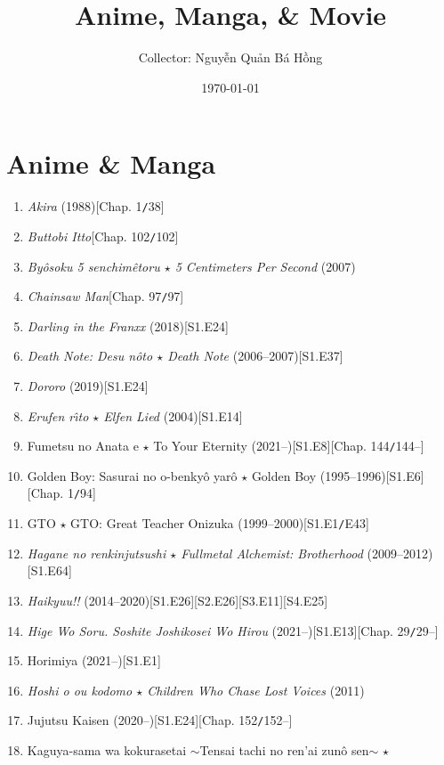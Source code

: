 \documentclass{article}
\title{Anime, Manga, {\large\&} Movie}
\author{Collector: Nguyễn Quản Bá Hồng}
\date{\today}
\begin{document}
\maketitle
\tableofcontents


\section{Anime \& Manga}
\begin{enumerate}
    \item \textit{Akira} (1988)\hfill[Chap. 1\texttt{/}38]
    \item \textit{Buttobi Itto}\hfill[Chap. 102\texttt{/}102]
    \item \textit{By\^osoku 5 senchimêtoru $\star$ 5 Centimeters Per Second} (2007)
    \item \textit{Chainsaw Man}\hfill[Chap. 97\texttt{/}97]
    \item \textit{Darling in the Franxx} (2018)\hfill[S1.E24]
    \item \textit{Death Note: Desu n\^oto $\star$ Death Note} (2006--2007)\hfill[S1.E37]
    \item \textit{Dororo} (2019)\hfill[S1.E24]
    \item \textit{Erufen r\^{\i}to $\star$ Elfen Lied} (2004)\hfill[S1.E14]
    \item Fumetsu no Anata e $\star$ To Your Eternity (2021--)\hfill[S1.E8][Chap. 144\texttt{/}144--]
    \item Golden Boy: Sasurai no o-benky\^o yar\^o $\star$ Golden Boy (1995--1996)\hfill[S1.E6][Chap. 1\texttt{/}94]
    \item GTO $\star$ GTO: Great Teacher Onizuka (1999--2000)\hfill[S1.E1\texttt{/}E43]
    \item \textit{Hagane no renkinjutsushi $\star$ Fullmetal Alchemist: Brotherhood} (2009--2012)\hfill[S1.E64]
    \item \textit{Haikyuu!!} (2014--2020)\hfill[S1.E26][S2.E26][S3.E11][S4.E25]
    \item \textit{Hige Wo Soru. Soshite Joshikosei Wo Hirou} (2021--)\hfill[S1.E13][Chap. 29\texttt{/}29--]
    \item Horimiya (2021--)\hfill[S1.E1]
    \item \textit{Hoshi o ou kodomo $\star$ Children Who Chase Lost Voices} (2011)
    \item Jujutsu Kaisen (2020--)\hfill[S1.E24][Chap. 152\texttt{/}152--]
    \item Kaguya-sama wa kokurasetai $\sim$Tensai tachi no ren'ai zun\^o sen$\sim$ $\star$
    

\end{enumerate}
\end{document}
